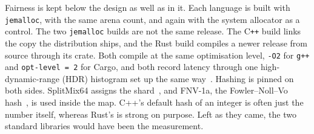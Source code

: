 \documentclass[english,oneside,a4paper,censored,csm,software-track-2020]{HYthesisML}
\begin{document}
Fairness is kept below the design as well as in it. Each language is built
with \texttt{jemalloc}, with the same arena count, and again with the system
allocator as a control. The two \texttt{jemalloc} builds are not the same
release. The C\texttt{++} build links the copy the distribution ships, and the
Rust build compiles a newer release from source through its crate. Both compile
at the same optimisation level, \texttt{-O2} for \texttt{g++} and
\texttt{opt-level = 2} for Cargo, and both record latency through one
high-dynamic-range (HDR) histogram set up the same way~\cite{tene_hdrhistogram}.
Hashing is pinned on both sides. SplitMix64 assigns the
shard~\cite{steele2014splitmix}, and FNV-1a, the Fowler--Noll--Vo
hash~\cite{rfc9923}, is used inside the map. C++'s default hash of an integer is
often just the number itself, whereas Rust's is strong on purpose. Left as they
came, the two standard libraries would have been the measurement.
\end{document}
